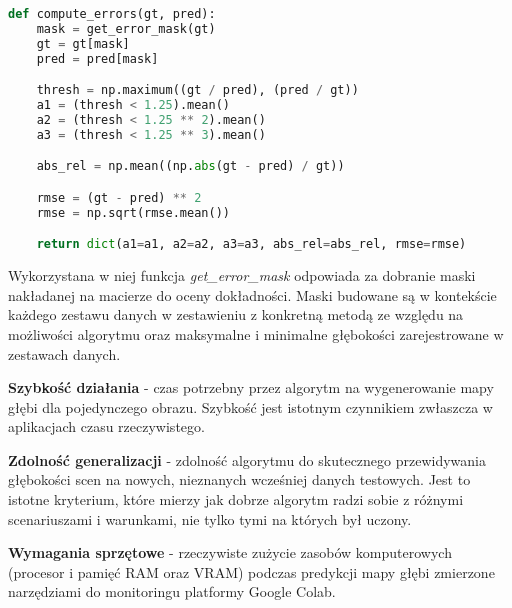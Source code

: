 \begin{lstlisting}[style=EEStyle,language=python,numbers=none,frame=none]
def compute_errors(gt, pred):
    mask = get_error_mask(gt)
    gt = gt[mask]
    pred = pred[mask]

    thresh = np.maximum((gt / pred), (pred / gt))
    a1 = (thresh < 1.25).mean()
    a2 = (thresh < 1.25 ** 2).mean()
    a3 = (thresh < 1.25 ** 3).mean()

    abs_rel = np.mean((np.abs(gt - pred) / gt))

    rmse = (gt - pred) ** 2
    rmse = np.sqrt(rmse.mean())

    return dict(a1=a1, a2=a2, a3=a3, abs_rel=abs_rel, rmse=rmse)
\end{lstlisting}

Wykorzystana w niej funkcja \textit{get\_error\_mask} odpowiada za dobranie maski nakładanej na macierze do oceny dokładności. Maski budowane są w kontekście każdego zestawu danych w zestawieniu z konkretną metodą ze względu na możliwości algorytmu oraz maksymalne i minimalne głębokości zarejestrowane w zestawach danych.

\textbf{Szybkość działania} - czas potrzebny przez algorytm na wygenerowanie mapy głębi dla pojedynczego obrazu. Szybkość jest istotnym czynnikiem zwłaszcza w aplikacjach czasu rzeczywistego.

\textbf{Zdolność generalizacji} - zdolność algorytmu do skutecznego przewidywania głębokości scen na nowych, nieznanych wcześniej danych testowych. Jest to istotne kryterium, które mierzy jak dobrze algorytm radzi sobie z różnymi scenariuszami i warunkami, nie tylko tymi na których był uczony.

\textbf{Wymagania sprzętowe} - rzeczywiste zużycie zasobów komputerowych (procesor i pamięć RAM oraz VRAM) podczas predykcji mapy głębi zmierzone narzędziami do monitoringu platformy Google Colab.

